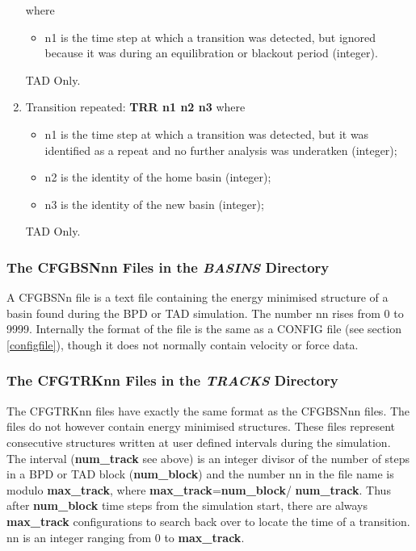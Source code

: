 \begin{enumerate}
where
\begin{itemize}
\item n1 is the time step at which a transition was detected, but
ignored because it was during an equilibration or blackout period
(integer). 
\end{itemize}
TAD Only.
\item Transition repeated: {\bf TRR n1 n2 n3} \newline
where
\begin{itemize}
\item n1 is the time step at which a transition was detected, but
it was identified as a repeat and no further analysis was underatken
(integer);
\item n2 is the identity of the home basin (integer);
\item n3 is the identity of the new basin (integer);
\end{itemize}
TAD Only.
\end{enumerate}

\subsubsection{The CFGBSNnn Files in the {\em BASINS} Directory}
\label{cfgbsn}

A CFGBSNn file is a text file containing the energy minimised
structure of a basin found during the BPD or TAD
simulation. The number nn rises from 0 to 9999. Internally the format
of the file is the same as a CONFIG file (see section
\ref{configfile}), though it does not normally contain velocity or 
force data.

\subsubsection{The CFGTRKnn Files in the {\em TRACKS} Directory}

The CFGTRKnn files have exactly the same format as the CFGBSNnn
files. The files do not however contain energy minimised structures.
These files represent consecutive structures written at user defined
intervals during the simulation. The interval ({\bf num\_track} see
above) is an integer divisor of the number of steps in a BPD or TAD
block ({\bf num\_block}) and the number nn in the file name is modulo
{\bf max\_track}, where {\bf max\_track}={\bf num\_block}/{\bf
num\_track}. Thus after {\bf num\_block} time steps from the
simulation start, there are always {\bf max\_track} configurations to
search back over to locate the time of a transition. nn is an integer
ranging from 0 to {\bf max\_track}.

